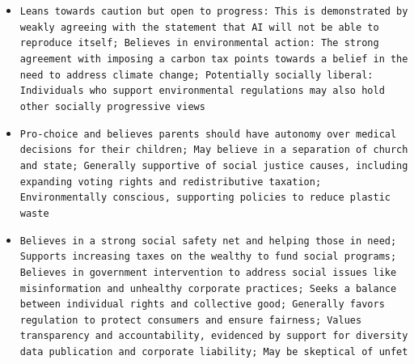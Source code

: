 \documentclass[11pt]{article}
\begin{document}
\begin{itemize}
\item \texttt{Leans towards caution but open to progress: This is demonstrated by weakly agreeing with the statement that AI will not be able to reproduce itself; Believes in environmental action: The strong agreement with imposing a carbon tax points towards a belief in the need to address climate change; Potentially socially liberal:  Individuals who support environmental regulations may also hold other socially progressive views}
\item \texttt{Pro-choice and believes parents should have autonomy over medical decisions for their children; May believe in a separation of church and state; Generally supportive of social justice causes, including expanding voting rights and redistributive taxation; Environmentally conscious, supporting policies to reduce plastic waste}
\item \texttt{Believes in a strong social safety net and helping those in need; Supports increasing taxes on the wealthy to fund social programs; Believes in government intervention to address social issues like misinformation and unhealthy corporate practices; Seeks a balance between individual rights and collective good; Generally favors regulation to protect consumers and ensure fairness; Values transparency and accountability, evidenced by support for diversity data publication and corporate liability; May be skeptical of unfet}
\end{itemize}
\end{document}
